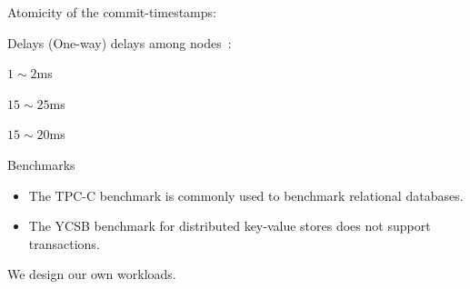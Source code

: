 \begin{frame}{}
  \begin{center}
  \end{center}
\end{frame}

\begin{frame}{}
  \begin{center}
    \begin{minipage}{1.0\textwidth}
      
    \end{minipage}
  \end{center}
\end{frame}

\begin{frame}{}
  Atomicity of the commit-timestamps:

\end{frame}

\begin{frame}{Delays}
  (One-way) delays among nodes~\footnotemark:
  \begin{description}
    \item[Within datacenter:] $1 \sim 2$ms
    \item[Across datacenters:] $15 \sim 25$ms
    \item[Clients to nodes:] $15 \sim 20$ms
  \end{description}

\end{frame}

\begin{frame}{Benchmarks}
  \begin{itemize}
    \item The TPC-C benchmark is commonly used to benchmark relational databases.
    \item The YCSB benchmark  for distributed key-value stores
      does not support transactions.
  \end{itemize}

  \vspace{0.60cm}
  \centerline{We design our own workloads.}
\end{frame}

\begin{frame}{}
\end{frame}

